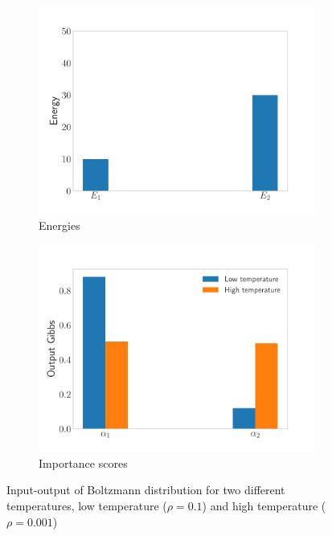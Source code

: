 \begin{figure}[!h]
\centering
\begin{subfigure}{.5\textwidth}
  \centering
  \includegraphics[width=.95\linewidth]{figures/input-gibbs}
  \caption{Energies}
\end{subfigure}%
\begin{subfigure}{.5\textwidth}
  \centering
  \includegraphics[width=.95\linewidth]{figures/result-gibbs}
  \caption{Importance scores}
\end{subfigure}
\caption[Input-output of Boltzmann distribution for two different temperatures]{Input-output of Boltzmann distribution for two different temperatures, low temperature ($\rho = 0.1$) and high temperature ($\rho = 0.001$)}
\label{fig:gibbs}
\end{figure}


